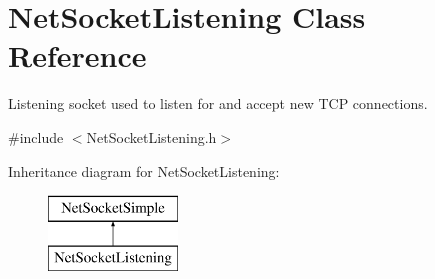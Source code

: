 \hypertarget{class_net_socket_listening}{
\section{NetSocketListening Class Reference}
\label{class_net_socket_listening}
}


Listening socket used to listen for and accept new TCP connections.  




{\ttfamily \#include $<$NetSocketListening.h$>$}

Inheritance diagram for NetSocketListening:\begin{figure}[H]
\begin{center}
\leavevmode
\includegraphics[height=2.000000cm]{class_net_socket_listening}
\end{center}
\end{figure}
